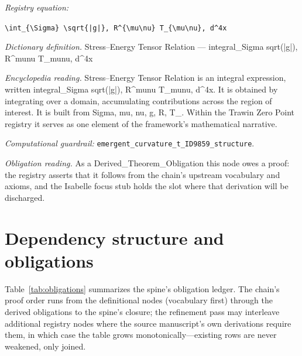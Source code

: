 \documentclass[11pt]{article}
\theoremstyle{remark}
\begin{document}
\noindent\textit{Registry equation:}\par
{\small\texttt{\textbackslash{}int\_\{\textbackslash{}Sigma\} \textbackslash{}sqrt\{|g|\}, R\textasciicircum{}\{\textbackslash{}mu\textbackslash{}nu\} T\_\{\textbackslash{}mu\textbackslash{}nu\}, d\textasciicircum{}4x}}\par\medskip
\noindent\textit{Dictionary definition.} Stress--Energy Tensor Relation --- integral\_Sigma sqrt(|g|), R\textasciicircum{}munu T\_munu, d\textasciicircum{}4x\par\medskip
\noindent\textit{Encyclopedia reading.} Stress--Energy Tensor Relation is an integral expression, written integral\_Sigma sqrt(|g|), R\textasciicircum{}munu T\_munu, d\textasciicircum{}4x. It is obtained by integrating over a domain, accumulating contributions across the region of interest. It is built from Sigma, mu, nu, g, R, T\_. Within the Trawin Zero Point registry it serves as one element of the framework's mathematical narrative.
\par\medskip\noindent\textit{Computational guardrail:} \texttt{emergent\_curvature\_t\_ID9859\_structure}.
\par\medskip\noindent\textit{Obligation reading.} As a Derived\_Theorem\_Obligation this node owes a proof: the registry asserts that it follows from the chain's upstream vocabulary and axioms, and the Isabelle focus stub holds the slot where that derivation will be discharged.

\section{Dependency structure and obligations}
\label{sec:dep}

Table~\ref{tab:obligations} summarizes the spine's obligation ledger. The chain's proof order runs from the definitional nodes (vocabulary first) through the derived obligations to the spine's closure; the refinement pass may interleave additional registry nodes where the source manuscript's own derivations require them, in which case the table grows monotonically---existing rows are never weakened, only joined.
\end{document}
